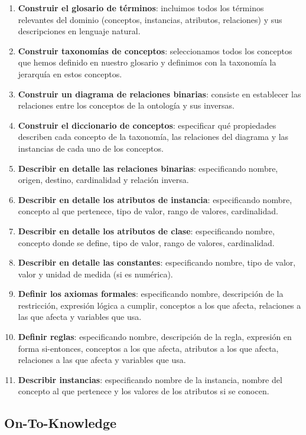 \begin{enumerate}
	\item \textbf{Construir el glosario de términos}: incluimos todos los términos relevantes del dominio (conceptos, instancias, atributos, relaciones) y sus descripciones en lenguaje natural.
	\item \textbf{Construir taxonomías de conceptos}: seleccionamos todos los conceptos que hemos definido en nuestro glosario y definimos con la taxonomía la jerarquía en estos conceptos.
	\item \textbf{Construir un diagrama de relaciones binarias}: consiste en establecer las relaciones entre los conceptos de la ontología y sus inversas.
	\item \textbf{Construir el diccionario de conceptos}: especificar qué propiedades describen cada concepto de la taxonomía, las relaciones del diagrama y las instancias de cada uno de los conceptos.
	\item \textbf{Describir en detalle las relaciones binarias}: especificando nombre, origen, destino, cardinalidad y relación inversa.
	\item \textbf{Describir en detalle los atributos de instancia}: especificando nombre, concepto al que pertenece, tipo de valor, rango de valores, cardinalidad.
	\item \textbf{Describir en detalle los atributos de clase}: especificando nombre, concepto donde se define, tipo de valor, rango de valores, cardinalidad.
	\item \textbf{Describir en detalle las constantes}: especificando nombre, tipo de valor, valor y unidad de medida (si es numérica).
	\item \textbf{Definir los axiomas formales}: especificando nombre, descripción de la restricción, expresión lógica a cumplir, conceptos a los que afecta, relaciones a las que afecta y variables que usa.
	\item \textbf{Definir reglas}: especificando nombre, descripción de la regla, expresión en forma si-entonces, conceptos a los que afecta, atributos a los que afecta, relaciones a las que afecta y variables que usa.
	\item \textbf{Describir instancias}: especificando nombre de la instancia, nombre del concepto al que pertenece y los valores de los atributos si se conocen.
\end{enumerate}

\subsection{On-To-Knowledge}

